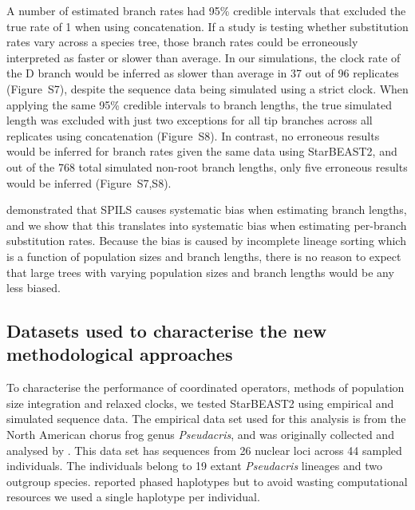 \documentclass[12pt]{article}
\begin{document}
A number of estimated branch rates had 95\% credible intervals that excluded
the true rate of 1 when using concatenation. If a study is testing whether
substitution rates vary across a species tree, those branch rates could be
erroneously interpreted as faster or slower than average. In our simulations,
the clock rate of the D branch would be inferred as slower than average in 37
out of 96 replicates (Figure~S7), despite the sequence data being simulated
using a strict clock. When applying the same 95\% credible intervals to branch
lengths, the true simulated length was excluded with just two exceptions for
all tip branches across all replicates using concatenation (Figure~S8). In
contrast, no erroneous results would be inferred for branch rates given the
same data using StarBEAST2, and out of the 768 total simulated non-root branch
lengths, only five erroneous results would be inferred (Figure~S7,S8).

\cite{Mendes01072016} demonstrated that SPILS causes systematic bias when
estimating branch lengths, and we show that this translates into systematic
bias when estimating per-branch substitution rates. Because the bias is caused
by incomplete lineage sorting which is a function of population sizes and
branch lengths, there is no reason to expect that large trees with varying
population sizes and branch lengths would be any less biased.

\subsection{Datasets used to characterise the new methodological approaches}

To characterise the performance of coordinated operators, methods of
population size integration and relaxed clocks, we tested StarBEAST2 using
empirical and simulated sequence data. The empirical data set used for this
analysis is from the North American chorus frog genus \textit{Pseudacris}, and
was originally collected and analysed by \cite{Barrow201478}. This data set
has sequences from 26 nuclear loci across 44 sampled individuals. The individuals
belong to 19 extant \textit{Pseudacris} lineages and two outgroup species.
\cite{Barrow201478} reported phased haplotypes but to avoid wasting
computational resources we used a single haplotype per individual.
\end{document}
